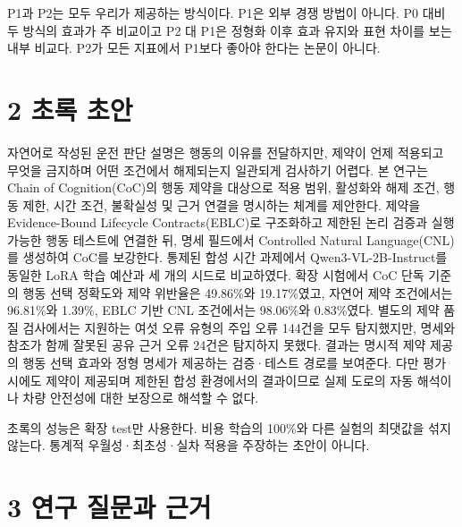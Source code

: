 \documentclass[11pt,a4paper]{article}
\begin{document}
P1과 P2는 모두 우리가 제공하는 방식이다. P1은 외부 경쟁 방법이 아니다. P0 대비 두 방식의 효과가 주 비교이고 P2 대 P1은 정형화 이후 효과 유지와 표현 차이를 보는 내부 비교다. P2가 모든 지표에서 P1보다 좋아야 한다는 논문이 아니다.\par

\clearpage{}\section*{2 초록 초안}

자연어로 작성된 운전 판단 설명은 행동의 이유를 전달하지만, 제약이 언제 적용되고 무엇을 금지하며 어떤 조건에서 해제되는지 일관되게 검사하기 어렵다. 본 연구는 Chain of Cognition(CoC)의 행동 제약을 대상으로 적용 범위, 활성화와 해제 조건, 행동 제한, 시간 조건, 불확실성 및 근거 연결을 명시하는 체계를 제안한다. 제약을 Evidence-Bound Lifecycle Contracts(EBLC)로 구조화하고 제한된 논리 검증과 실행 가능한 행동 테스트에 연결한 뒤, 명세 필드에서 Controlled Natural Language(CNL)를 생성하여 CoC를 보강한다. 통제된 합성 시간 과제에서 Qwen3-VL-2B-Instruct를 동일한 LoRA 학습 예산과 세 개의 시드로 비교하였다. 확장 시험에서 CoC 단독 기준의 행동 선택 정확도와 제약 위반율은 49.86\%와 19.17\%였고, 자연어 제약 조건에서는 96.81\%와 1.39\%, EBLC 기반 CNL 조건에서는 98.06\%와 0.83\%였다. 별도의 제약 품질 검사에서는 지원하는 여섯 오류 유형의 주입 오류 144건을 모두 탐지했지만, 명세와 참조가 함께 잘못된 공유 근거 오류 24건은 탐지하지 못했다. 결과는 명시적 제약 제공의 행동 선택 효과와 정형 명세가 제공하는 검증·테스트 경로를 보여준다. 다만 평가 시에도 제약이 제공되며 제한된 합성 환경에서의 결과이므로 실제 도로의 자동 해석이나 차량 안전성에 대한 보장으로 해석할 수 없다.\par

초록의 성능은 확장 test만 사용한다. 비용 학습의 100\%와 다른 실험의 최댓값을 섞지 않는다. 통계적 우월성·최초성·실차 적용을 주장하는 초안이 아니다.\par

\clearpage{}\section*{3 연구 질문과 근거}
\end{document}
